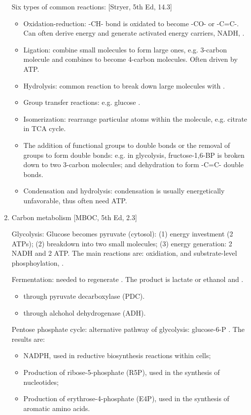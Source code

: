 \documentclass{report}
\begin{document}
\begin{enumerate}
Six types of common reactions: [Stryer, 5th Ed, 14.3]
\begin{itemize}
	\item Oxidation-reduction: -CH- bond is oxidated to become -CO- or -C=C-. Can often derive energy and generate activated energy carriers, NADH, . 
	\item Ligation: combine small molecules to form large ones, e.g. 3-carbon molecule and  combines to become 4-carbon molecules. Often driven by ATP. 
	\item Hydrolysis: common reaction to break down large molecules with . 
	\item Group transfer reactions: e.g. glucose . 
	\item Isomerization: rearrange particular atoms within the molecule, e.g. citrate  in TCA cycle. 
	\item The addition of functional groups to double bonds or the removal of groups to form double bonds: e.g. in glycolysis, fructose-1,6-BP is broken down to two 3-carbon molecules; and dehydration to form -C=C- double bonds.  
	\item Condensation and hydrolysis: condensation is usually energetically unfavorable, thus often need ATP. 
\end{itemize}
	
\item{Carbon metabolism} [MBOC, 5th Ed, 2.3]

Glycolysis: Glucose becomes pyruvate (cytosol): (1) energy investment (2 ATPs); (2) breakdown into two small molecules; (3) energy generation: 2 NADH and 2 ATP. The main reactions are: oxidiation,  and substrate-level phosphoylation, . 

Fermentation: needed to regenerate . The product is lactate or ethanol and .
\begin{itemize}
	\item {} through pyruvate decarboxylase (PDC). 
	\item {} through alchohol dehydrogenase (ADH). 
\end{itemize}

Pentose phosphate cycle: alternative pathway of glycolysis: glucose-6-P . The results are: 
\begin{itemize}
	\item NADPH, used in reductive biosynthesis reactions within cells;
	\item Production of ribose-5-phosphate (R5P), used in the synthesis of nucleotides;
	\item Production of erythrose-4-phosphate (E4P), used in the synthesis of aromatic amino acids.
\end{itemize}


\end{enumerate}
\end{document}
